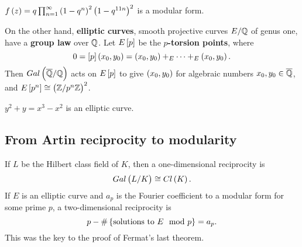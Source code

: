 \begin{example*}
$ f\br{z} = q\prod_{n = 1}^\infty \br{1 - q^n}^2\br{1 - q^{11n}}^2 $ is a modular form.
\end{example*}

On the other hand, \textbf{elliptic curves}, smooth projective curves $ E / \mathbb{Q} $ of genus one, have a \textbf{group law} over $ \mathbb{Q} $. Let $ E\sbr{p} $ be the \textbf{$ p $-torsion points}, where
$$ 0 = \sbr{p}\br{x_0, y_0} = \br{x_0, y_0} +_E \dots +_E \br{x_0, y_0}. $$
Then $ Gal\br{\overline{\Q} / \Q} $ acts on $ E\sbr{p} $ to give $ \br{x_0, y_0} $ for algebraic numbers $ x_0, y_0 \in \overline{\mathbb{Q}} $, and $ E\sbr{p^n} \cong \br{\Z / p^n\Z}^2 $.

\begin{example*}
$ y^2 + y = x^3 - x^2 $ is an elliptic curve.
\end{example*}

\subsection{From Artin reciprocity to modularity}

If $ L $ be the Hilbert class field of $ K $, then a one-dimensional reciprocity is
$$ Gal\br{L / K} \cong Cl\br{K}. $$
If $ E $ is an elliptic curve and $ a_p $ is the Fourier coefficient to a modular form for some prime $ p $, a two-dimensional reciprocity is
$$ p - \#\cbr{\text{solutions to} \ E \mod p} = a_p. $$
This was the key to the proof of Fermat's last theorem.

